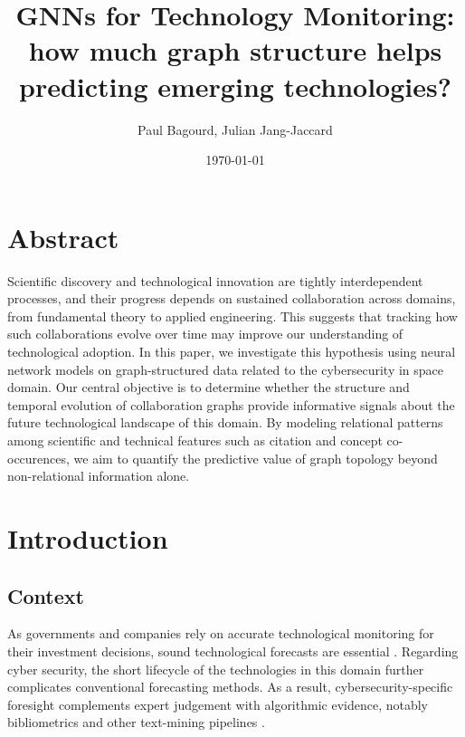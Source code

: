 \documentclass{article}
\title{GNNs for Technology Monitoring: how much graph structure helps predicting emerging technologies?}
\author{Paul Bagourd, Julian Jang-Jaccard}
\date{\today}
\begin{document}
\maketitle


\section*{Abstract}
Scientific discovery and technological innovation are tightly interdependent processes, and their progress depends on sustained collaboration across domains, from fundamental theory to applied engineering. This suggests that tracking how such collaborations evolve over time may improve our understanding of technological adoption. In this paper, we investigate this hypothesis using neural network models on graph-structured data related to the cybersecurity in space domain. Our central objective is to determine whether the structure and temporal evolution of collaboration graphs provide informative signals about the future technological landscape of this domain. By modeling relational patterns among scientific and technical features such as citation and concept co-occurences, we aim to quantify the predictive value of graph topology beyond non-relational information alone.
\newpage
\section{Introduction}

\subsection{Context}

As governments and companies rely on accurate technological monitoring for their investment decisions, sound technological forecasts are essential \cite{coccia2005technometrics,lee2021review,haleem2019tf,calleja2020forecasting}. Regarding cyber security, the short lifecycle of the technologies in this domain further complicates conventional forecasting methods.
As a result, cybersecurity-specific foresight complements expert judgement with algorithmic evidence, notably bibliometrics and other text-mining pipelines \cite{daim2016anticipating,dotsika2017disruptive,singer2014cybersecurity}.
\end{document}
